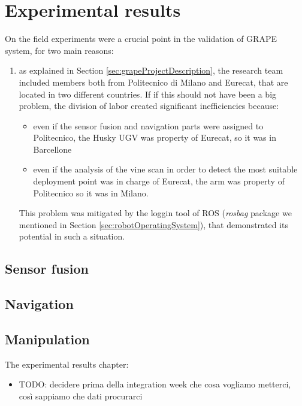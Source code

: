 
\chapter{Experimental results} \label{chap:experimentalResults}

On the field experiments were a crucial point in the validation of \ac{GRAPE} system, for two main reasons:
\begin{enumerate}
	\item as explained in Section \ref{sec:grapeProjectDescription}, the research team included members both from Politecnico di Milano and Eurecat, that are located in two different countries. If if this should not have been a big problem, the division of labor created significant inefficiencies because:
	\begin{itemize}
		\item even if the sensor fusion and navigation parts were assigned to Politecnico, the Husky \ac{UGV} was property of Eurecat, so it was in Barcellone
		\item even if the analysis of the vine scan in order to detect the most suitable deployment point was in charge of Eurecat, the arm was property of Politecnico so it was in Milano.
	\end{itemize}
	This problem was mitigated by the loggin tool of \ac{ROS} (\textit{rosbag} package we mentioned in Section \ref{sec:robotOperatingSystem}), that demonstrated its potential in such a situation.
\end{enumerate}
\section{Sensor fusion}

\section{Navigation}

\section{Manipulation}

The experimental results chapter:
\begin{itemize}
	\item TODO: decidere prima della integration week che cosa vogliamo metterci, così sappiamo che dati procurarci
\end{itemize}